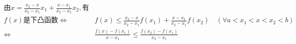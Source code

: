 \documentclass[preview]{standalone}
\begin{document}
\begin{align*}
& \text{由} x = \frac{x_2 - x}{x_2 - x_1}x_1 + \frac{x - x_1}{x_2 - x_1}x_2, \text{有} \\ & f(x) \text{是下凸函数} \Leftrightarrow\quad & f(x) \leqslant \frac{x_2 - x}{x_2 - x_1}f(x_1) + \frac{x - x_1}{x_2 - x_1}f(x_2)\quad (\forall a < x_1 < x < x_2 < b)\\ & \Leftrightarrow\quad & \frac{f(x) - f(x_1)}{x - x_1} \leqslant \frac{f(x_2) - f(x_1)}{x_2 - x_1}
\end{align*}
\end{document}
